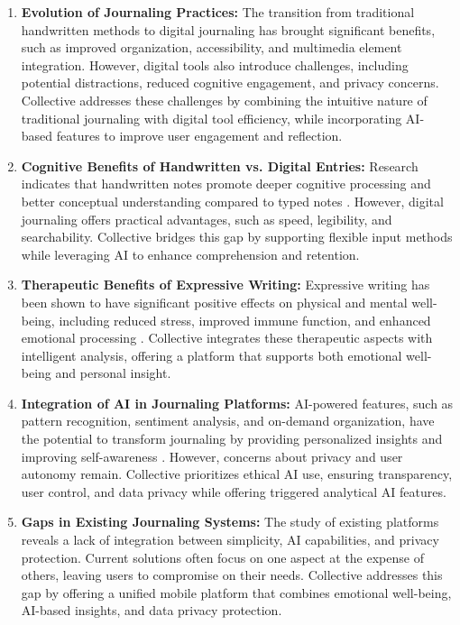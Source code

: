 \begin{enumerate}
	\item \textbf{Evolution of Journaling Practices:} The transition from traditional handwritten methods to digital journaling has brought significant benefits, such as improved organization, accessibility, and multimedia element integration. However, digital tools also introduce challenges, including potential distractions, reduced cognitive engagement, and privacy concerns. Collective addresses these challenges by combining the intuitive nature of traditional journaling with digital tool efficiency, while incorporating AI-based features to improve user engagement and reflection.
	
	\item \textbf{Cognitive Benefits of Handwritten vs. Digital Entries:} Research indicates that handwritten notes promote deeper cognitive processing and better conceptual understanding compared to typed notes \cite{mueller2014pen}. However, digital journaling offers practical advantages, such as speed, legibility, and searchability. Collective bridges this gap by supporting flexible input methods while leveraging AI to enhance comprehension and retention.
	
	\item \textbf{Therapeutic Benefits of Expressive Writing:} Expressive writing has been shown to have significant positive effects on physical and mental well-being, including reduced stress, improved immune function, and enhanced emotional processing \cite{pennebaker1999forming}. Collective integrates these therapeutic aspects with intelligent analysis, offering a platform that supports both emotional well-being and personal insight.
	
	\item \textbf{Integration of AI in Journaling Platforms:} AI-powered features, such as pattern recognition, sentiment analysis, and on-demand organization, have the potential to transform journaling by providing personalized insights and improving self-awareness \cite{allahyari2017text}. However, concerns about privacy and user autonomy remain. Collective prioritizes ethical AI use, ensuring transparency, user control, and data privacy while offering triggered analytical AI features.
	
	\item \textbf{Gaps in Existing Journaling Systems:} The study of existing platforms reveals a lack of integration between simplicity, AI capabilities, and privacy protection. Current solutions often focus on one aspect at the expense of others, leaving users to compromise on their needs. Collective addresses this gap by offering a unified mobile platform that combines emotional well-being, AI-based insights, and data privacy protection.
\end{enumerate}

